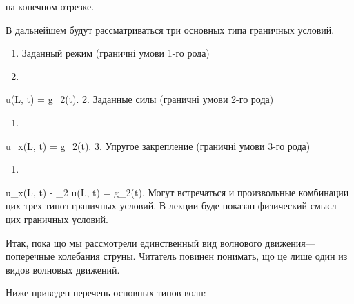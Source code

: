 \documentclass[
  ukrainian,
]{article}
\providecommand{\tightlist}{%
  \setlength{\itemsep}{0pt}\setlength{\parskip}{0pt}}
\begin{document}
на конечном отрезке.

В дальнейшем будут рассматриваться три основных типа граничных условий.

\begin{enumerate}
\def\labelenumi{\arabic{enumi}.}
\item
  Заданный режим (граничні умови 1-го рода)
\item
\end{enumerate}

u(L, t) = g\_2(t). 2. Заданные силы (граничні умови 2-го рода)

\begin{enumerate}
\def\labelenumi{\arabic{enumi}.}
\setcounter{enumi}{12}
\tightlist
\item
\end{enumerate}

u\_x(L, t) = g\_2(t). 3. Упругое закрепление (граничні умови 3-го рода)

\begin{enumerate}
\def\labelenumi{\arabic{enumi}.}
\setcounter{enumi}{13}
\tightlist
\item
\end{enumerate}

u\_x(L, t) - \gamma\_2 u(L, t) = g\_2(t). Могут встречаться и
произвольные комбинации цих трех типоз граничных условий. В лекции буде
показан физический смысл цих граничных условий.

Итак, пока що мы рассмотрели единственный вид волнового
движения---поперечные колебания струны. Читатель повинен понимать, що це
лише один из видов волновых движений.

Ниже приведен перечень основных типов волн:
\end{document}
